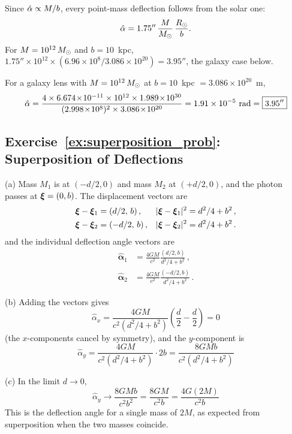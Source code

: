 \begin{annotation}
Since $\hat{\alpha} \propto M/b$, every point-mass deflection follows from the
solar one:
\[
\hat{\alpha} = 1.75''\,\frac{M}{M_{\odot}}\,\frac{R_\odot}{b} .
\]
For $M = 10^{12}\,M_{\odot}$ and $b = 10$~kpc,
$1.75''\times10^{12}\times(6.96\times10^8/3.086\times10^{20}) = 3.95''$,
the galaxy case below.
\end{annotation}


For a galaxy lens with $M = 10^{12}\,M_{\odot}$ at $b = 10$~kpc
$= 3.086 \times 10^{20}$~m,
\[
    \alphahat = \frac{4 \times 6.674\!\times\!10^{-11} \times
    10^{12} \times 1.989\!\times\!10^{30}}
    {(2.998\!\times\!10^{8})^2 \times 3.086\!\times\!10^{20}}
    = 1.91 \times 10^{-5}~\text{rad}
    = \boxed{3.95''}
\]

\subsection*{Exercise~\ref{ex:superposition_prob}: Superposition of Deflections}

(a) Mass $M_1$ is at $(-d/2, 0)$ and mass $M_2$ at $(+d/2, 0)$,
and the photon passes at $\boldsymbol{\xi} = (0, b)$.  The displacement vectors are
\begin{align*}
    \boldsymbol{\xi} - \boldsymbol{\xi}_1 &= (d/2,\, b) \,, &
    |\boldsymbol{\xi} - \boldsymbol{\xi}_1|^2 &= d^2/4 + b^2 \,, \\
    \boldsymbol{\xi} - \boldsymbol{\xi}_2 &= (-d/2,\, b) \,, &
    |\boldsymbol{\xi} - \boldsymbol{\xi}_2|^2 &= d^2/4 + b^2 \,.
\end{align*}
and the individual deflection angle vectors are
\begin{align*}
    \boldsymbol{\hat{\alpha}}_1 &= \frac{4GM}{c^2}
    \frac{(d/2, b)}{d^2/4 + b^2} \,, \\
    \boldsymbol{\hat{\alpha}}_2 &= \frac{4GM}{c^2}
    \frac{(-d/2, b)}{d^2/4 + b^2} \,.
\end{align*}

(b) Adding the vectors gives
\[
    \hat{\alpha}_x = \frac{4GM}{c^2(d^2/4 + b^2)}
    \left(\frac{d}{2} - \frac{d}{2}\right) = 0
\]
(the $x$-components cancel by symmetry), and the $y$-component is
\[
    \boxed{\hat{\alpha}_y = \frac{4GM}{c^2(d^2/4 + b^2)} \cdot 2b
    = \frac{8GMb}{c^2(d^2/4 + b^2)}}
\]

(c) In the limit $d \to 0$,
\[
    \hat{\alpha}_y \to \frac{8GMb}{c^2 b^2}
    = \frac{8GM}{c^2 b}
    = \frac{4G(2M)}{c^2 b}
\]
This is the deflection angle for a single mass of $2M$, as expected
from superposition when the two masses coincide.

